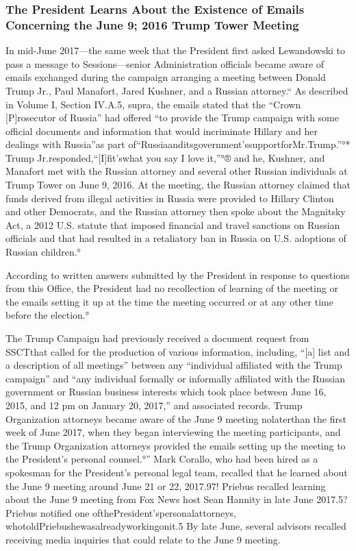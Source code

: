 \subsubsection{The President Learns About the Existence of Emails Concerning the June 9; 2016 Trump Tower Meeting}

In mid-June 2017—the same week that the President first asked Lewandowski to pass a message to Sessions—senior Administration officials became aware of emails exchanged during the campaign arranging a meeting between Donald Trump Jr., Paul Manafort, Jared Kushner, and a Russian attorney.“
As described in Volume I, Section IV.A.5, supra, the emails stated that the “Crown [P]rosecutor of Russia” had offered “to provide the Trump campaign with some official documents and information that would incriminate Hillary and her dealings with Russia”as part of“Russiaanditsgovernment'ssupportforMr.Trump.”°*
Trump Jr.responded,“[I]fit'swhat you say I love it,”°® and he, Kushner, and Manafort met with the Russian attorney and several other Russian individuals at Trump Tower on June 9, 2016.%
At the meeting, the Russian attorney claimed that funds derived from illegal activities in Russia were provided to Hillary Clinton and other Democrats, and the Russian attorney then spoke about the Magnitsky Act, a 2012 U.S. statute that imposed financial and travel sanctions on Russian officials and that had resulted in a retaliatory ban in Russia on U.S. adoptions of Russian children.°

According to written answers submitted by the President in response to questions from this Office, the President had no recollection of learning of the meeting or the emails setting it up at the time the meeting occurred or at any other time before the election.°

The Trump Campaign had previously received a document request from SSCTthat called for the production of various information, including, “[a] list and a description of all meetings” between any “individual affiliated with the Trump campaign” and “any individual formally or informally affiliated with the Russian government or Russian business interests which took place between June 16, 2015, and 12 pm on January 20, 2017,” and associated records.%
Trump Organization attorneys became aware of the June 9 meeting nolaterthan the first week of June 2017, when they began interviewing the meeting participants, and the Trump Organization attorneys provided the emails setting up the meeting to the President's personal counsel.°”
Mark Corallo, who had been hired as a spokesman for the President's personal legal team, recalled that he learned about the June 9 meeting around June 21 or 22, 2017.97!
Priebus recalled learning about the June 9 meeting from Fox News host Sean Hannity in late June 2017.5?
Priebus notified one ofthePresident'spersonalattorneys, whotoldPriebushewasalreadyworkingonit.5
By late June, several advisors recalled receiving media inquiries that could relate to the June 9 meeting. %

